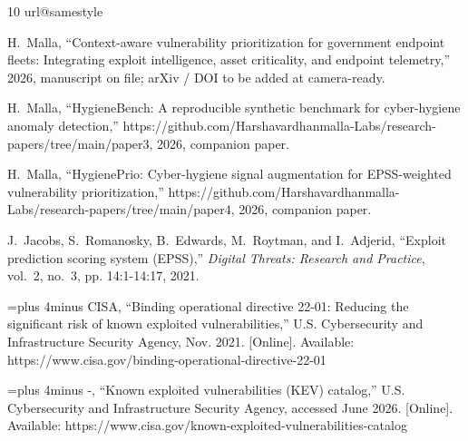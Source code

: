 \documentclass[journal]{IEEEtran}
\begin{document}
\begin{thebibliography}{10}
\providecommand{\url}[1]{#1}
\csname url@samestyle\endcsname
\providecommand{\newblock}{\relax}
\providecommand{\bibinfo}[2]{#2}
\providecommand{\BIBentrySTDinterwordspacing}{\spaceskip=0pt\relax}
\providecommand{\BIBentryALTinterwordstretchfactor}{4}
\providecommand{\BIBentryALTinterwordspacing}{\spaceskip=\fontdimen2\font plus
\BIBentryALTinterwordstretchfactor\fontdimen3\font minus
  \fontdimen4\font\relax}
\providecommand{\BIBforeignlanguage}[2]{{%
\expandafter\ifx\csname l@#1\endcsname\relax
\typeout{** WARNING: IEEEtran.bst: No hyphenation pattern has been}%
\typeout{** loaded for the language `#1'. Using the pattern for}%
\typeout{** the default language instead.}%
\else
\language=\csname l@#1\endcsname
\fi
#2}}
\providecommand{\BIBdecl}{\relax}
\BIBdecl

H.~Malla, ``Context-aware vulnerability prioritization for government endpoint
  fleets: Integrating exploit intelligence, asset criticality, and endpoint
  telemetry,'' 2026, manuscript on file; arXiv / DOI to be added at
  camera-ready.

H.~Malla, ``{HygieneBench}: A reproducible synthetic benchmark for cyber-hygiene
  anomaly detection,''
  \url{https://github.com/Harshavardhanmalla-Labs/research-papers/tree/main/paper3},
  2026, companion paper.

H.~Malla, ``{HygienePrio}: Cyber-hygiene signal augmentation for {EPSS}-weighted
  vulnerability prioritization,''
  \url{https://github.com/Harshavardhanmalla-Labs/research-papers/tree/main/paper4},
  2026, companion paper.

J.~Jacobs, S.~Romanosky, B.~Edwards, M.~Roytman, and I.~Adjerid, ``Exploit
  prediction scoring system ({EPSS}),'' \emph{Digital Threats: Research and
  Practice}, vol.~2, no.~3, pp. 14:1-14:17, 2021.

\BIBentryALTinterwordspacing
{CISA}, ``Binding operational directive 22-01: Reducing the significant risk of
  known exploited vulnerabilities,'' U.S. Cybersecurity and Infrastructure
  Security Agency, Nov. 2021. [Online]. Available:
  \url{https://www.cisa.gov/binding-operational-directive-22-01}
\BIBentrySTDinterwordspacing

\BIBentryALTinterwordspacing
-, ``Known exploited vulnerabilities ({KEV}) catalog,'' U.S. Cybersecurity
  and Infrastructure Security Agency, accessed June 2026. [Online]. Available:
  \url{https://www.cisa.gov/known-exploited-vulnerabilities-catalog}
\BIBentrySTDinterwordspacing


\end{thebibliography}
\end{document}
